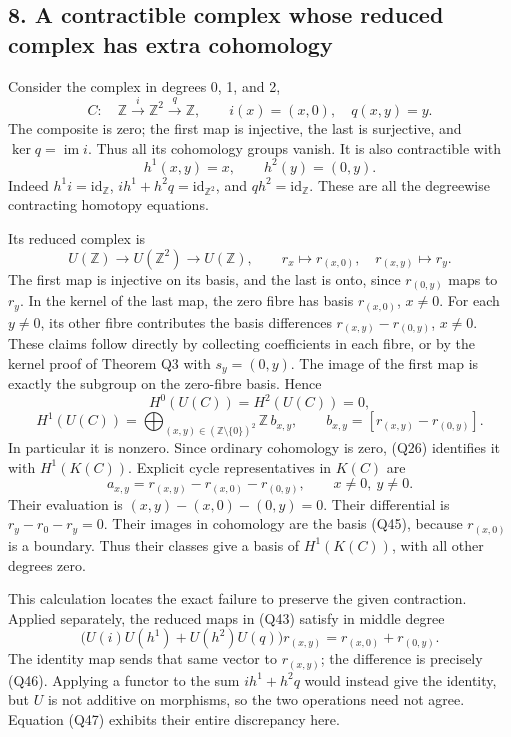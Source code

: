 \documentclass[
]{article}
\begin{document}
\subsection{8. A contractible complex whose reduced complex has extra
cohomology}\label{a-contractible-complex-whose-reduced-complex-has-extra-cohomology}

Consider the complex in degrees 0, 1, and 2, \[
C:\quad\mathbb Z\xrightarrow{\ i\ }\mathbb Z^2
\xrightarrow{\ q\ }\mathbb Z,
\qquad i(x)=(x,0),\quad q(x,y)=y.
\tag{Q42}
\] The composite is zero; the first map is injective, the last is
surjective, and \(\ker q=\operatorname{im}i\). Thus all its cohomology
groups vanish. It is also contractible with \[
h^1(x,y)=x,\qquad h^2(y)=(0,y).
\tag{Q43}
\] Indeed \(h^1i=\mathrm{id}_{\mathbb Z}\),
\(ih^1+h^2q=\mathrm{id}_{\mathbb Z^2}\), and
\(qh^2=\mathrm{id}_{\mathbb Z}\). These are all the degreewise
contracting homotopy equations.

Its reduced complex is \[
U(\mathbb Z)\longrightarrow U(\mathbb Z^2)\longrightarrow U(\mathbb Z),
\qquad r_x\longmapsto r_{(x,0)},\quad
r_{(x,y)}\longmapsto r_y.
\tag{Q44}
\] The first map is injective on its basis, and the last is onto, since
\(r_{(0,y)}\) maps to \(r_y\). In the kernel of the last map, the zero
fibre has basis \(r_{(x,0)}\), \(x\ne0\). For each \(y\ne0\), its other
fibre contributes the basis differences \(r_{(x,y)}-r_{(0,y)}\),
\(x\ne0\). These claims follow directly by collecting coefficients in
each fibre, or by the kernel proof of Theorem Q3 with \(s_y=(0,y)\). The
image of the first map is exactly the subgroup on the zero-fibre basis.
Hence \[
H^0(U(C))=H^2(U(C))=0,
\] \[
H^1(U(C))=
\bigoplus_{(x,y)\in(\mathbb Z\setminus\{0\})^2}
\mathbb Z\,b_{x,y},
\qquad
b_{x,y}=[r_{(x,y)}-r_{(0,y)}].
\tag{Q45}
\] In particular it is nonzero. Since ordinary cohomology is zero, (Q26)
identifies it with \(H^1(K(C))\). Explicit cycle representatives in
\(K(C)\) are \[
a_{x,y}=r_{(x,y)}-r_{(x,0)}-r_{(0,y)},
\qquad x\ne0,\ y\ne0.
\tag{Q46}
\] Their evaluation is \((x,y)-(x,0)-(0,y)=0\). Their differential is
\(r_y-r_0-r_y=0\). Their images in cohomology are the basis (Q45),
because \(r_{(x,0)}\) is a boundary. Thus their classes give a basis of
\(H^1(K(C))\), with all other degrees zero.

This calculation locates the exact failure to preserve the given
contraction. Applied separately, the reduced maps in (Q43) satisfy in
middle degree \[
\bigl(U(i)U(h^1)+U(h^2)U(q)\bigr)r_{(x,y)}
=r_{(x,0)}+r_{(0,y)}.
\tag{Q47}
\] The identity map sends that same vector to \(r_{(x,y)}\); the
difference is precisely (Q46). Applying a functor to the sum
\(ih^1+h^2q\) would instead give the identity, but \(U\) is not additive
on morphisms, so the two operations need not agree. Equation (Q47)
exhibits their entire discrepancy here.
\end{document}
